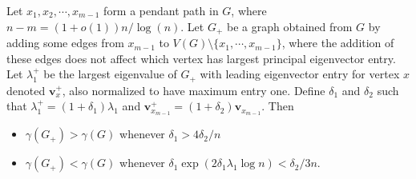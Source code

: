 \begin{lemma}\label{change}
Let $x_1, x_2, \cdots, x_{m-1}$ form a pendant path
  in $G$, where $n-m = (1+o(1)) n/\log(n)$.
  Let $G_+$ be a graph obtained from $G$ by adding some edges from $x_{m-1}$ to $V(G)\setminus \{x_1,\cdots, x_{m-1}\}$,
  where the addition of these edges does not affect which vertex
  has largest principal eigenvector entry.  Let
  $\lambda_1^+$ be the largest eigenvalue of $G_+$ with leading eigenvector
  entry for vertex $x$ denoted $\mathbf{v}_x^+$, also normalized to have maximum
  entry one.  
  Define $\delta_1$ and $\delta_2$ such that
  $\lambda_1^+ = (1 + \delta_1) \lambda_1$ and
  $\mathbf{v}_{x_{m-1}}^+ = (1 + \delta_2) \mathbf{v}_{x_{m-1}}$.  Then 
  \begin{itemize}
     \item $\gamma(G_+) > \gamma(G)$ whenever $\delta_1 > 4 \delta_2 / n$
     \item $\gamma(G_+) < \gamma(G)$ whenever $\delta_1 \exp(2 \delta_1 \lambda_1 \log n ) <  \delta_2 / 3 n$.
  \end{itemize}
\end{lemma}
